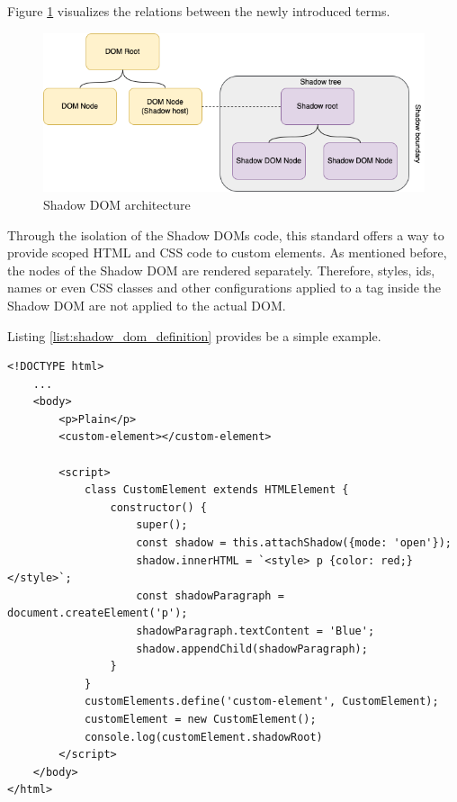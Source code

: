 Figure \ref{fig:shadow_dom} visualizes the relations between the newly introduced terms.

\begin{figure}[!h]
	\centering
	\includegraphics[width=1\textwidth]{Figures/shadow_dom.drawio.png}
	\caption{Shadow DOM architecture}
	\label{fig:shadow_dom}
\end{figure}

Through the isolation of the Shadow DOMs code, this standard offers a way to provide scoped HTML and CSS code to custom elements. As mentioned before, the nodes of the Shadow DOM are rendered separately. Therefore, styles, ids, names or even CSS classes and other configurations applied to a tag inside the Shadow DOM are not applied to the actual DOM.

Listing \ref{list:shadow_dom_definition} provides be a simple example.

\begin{lstlisting}[caption=Definition of a custom element using the Shadow DOM \cite{simon_thesis}, label=list:shadow_dom_definition,  xleftmargin=.01\textwidth, xrightmargin=.01\textwidth]
<!DOCTYPE html> 
	...
	<body>
		<p>Plain</p> 
		<custom-element></custom-element>
		
		<script>
			class CustomElement extends HTMLElement {
				constructor() { 
					super();
					const shadow = this.attachShadow({mode: 'open'}); 
					shadow.innerHTML = `<style> p {color: red;} </style>`; 
					const shadowParagraph = document.createElement('p'); 
					shadowParagraph.textContent = 'Blue'; 
					shadow.appendChild(shadowParagraph);
				}
			}
			customElements.define('custom-element', CustomElement); 
			customElement = new CustomElement(); 
			console.log(customElement.shadowRoot)
		</script>
	</body>
</html>
\end{lstlisting}

